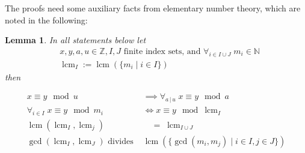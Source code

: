 \documentclass[12pt]{article}
\newtheorem{lemma}{Lemma}
\providecommand{\divides}[2]{#1 \, \lvert \, #2}
\providecommand{\for}[2]{\forall_{#1 \in #2} \;}
\providecommand{\set}[2]{\{ #1 \mid #2 \}}
\def\coloneqq{:=}
\def\Z{\mathbb{Z}}
\def\N{\mathbb{N}}
\DeclareMathOperator{\lcm}{lcm}
\begin{document}
The proofs need some auxiliary facts from elementary number theory, which are noted in the following:

\begin{lemma}\label{lemma}
	In all statements below let
	\begin{align*}
	&x, y, a, u \in \Z, I, J \text{ finite index sets, and } \for{i}{I \cup J} m_i \in \N \\
	&\lcm_I \coloneqq \lcm\left(\set{m_i}{i \in I}\right)
	\end{align*}
	 then
		
	\begin{align}
		\label{lemma.a}\tag{L1}
		x \equiv y \mod u &\implies \forall_{\divides{a}{u}} \; x \equiv y \mod a\\
		\label{lemma.b}\tag{L2}
		\for{i}{I} x \equiv y \mod m_i	&\iff x \equiv y \mod \lcm_I\\  \label{lemma.c}\tag{L3}
		\lcm\left(\lcm_I, \lcm_j\right) & \quad = \; \lcm_{I \cup J}\\
		\label{lemma.d}\tag{L4}
		\gcd\left(\lcm_I, \lcm_J\right) \text{ divides }
		&\lcm\left(\set{\gcd\left(m_i, m_j\right)}{i \in I, j \in J}\right)
	\end{align}
		
\end{lemma}
\end{document}
